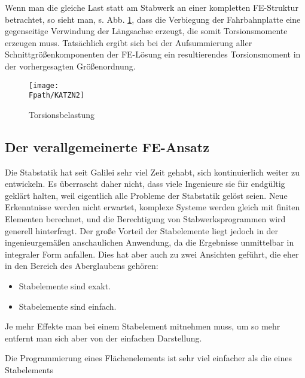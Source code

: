 Wenn man die gleiche Last statt am Stabwerk an einer kompletten FE-Struktur betrachtet, so sieht man, s. Abb. \ref{KatzN2}, dass die Verbiegung der Fahrbahnplatte eine gegenseitige Verwindung der L\"{a}ngsachse erzeugt, die somit Torsionsmomente erzeugen muss. Tats\"{a}chlich ergibt sich bei der Aufsummierung aller Schnittgr\"{o}{\ss}enkomponenten der FE-L\"{o}sung ein resultierendes Torsionsmoment in der vorhergesagten Gr\"{o}{\ss}enordnung.
\begin{figure}[tbp] \centering
\if {} \sidecaption \fi
\texttt{[image: \\Fpath/KATZN2]}
\caption{Torsionsbelastung}
\label{KatzN2}%
\end{figure}%

{\textcolor{sectionTitleBlue}{\section{Der verallgemeinerte FE-Ansatz}}}
Die Stabstatik hat seit Galilei sehr viel Zeit gehabt, sich kontinuierlich weiter zu entwickeln. Es \"{u}berrascht daher nicht, dass viele Ingenieure sie f\"{u}r endg\"{u}ltig gekl\"{a}rt halten, weil eigentlich alle Probleme der Stabstatik gel\"{o}st seien. Neue Erkenntnisse werden nicht erwartet, komplexe Systeme werden gleich  mit finiten Elementen berechnet, und die Berechtigung von Stabwerks\-pro\-gram\-men wird generell hinterfragt. Der gro{\ss}e Vorteil der Stab\-elemente liegt jedoch in der ingenieurgem\"{a}{\ss}en anschaulichen Anwendung, da die Ergebnisse unmittelbar in integraler Form anfallen. Dies hat aber auch zu zwei Ansichten gef\"{u}hrt, die eher in den Bereich des Aberglaubens geh\"{o}ren:\\
\begin{itemize}
\item   Stabelemente sind exakt.
\item   Stabelemente sind einfach.
\end{itemize}
Je mehr Effekte man bei einem Stabelement mitnehmen muss, um so mehr entfernt man sich
aber von der einfachen Darstellung. \\

\hspace*{-12pt}\colorbox{highlightBlue}{\parbox{0.98\textwidth}{Die Programmierung eines Fl\"{a}chenelements ist sehr
viel einfacher als die eines Stabelements}}\\


